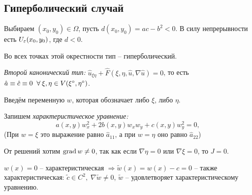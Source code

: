 \documentclass[../main.tex]{subfiles}
\begin{document}
\subsection{Гиперболический случай}

Выбираем $(x_0, y_0) \in \Omega$, пусть $d(x_0, y_0) = ac - b^2 < 0$. В силу непрерывности есть $U_\varepsilon(x_0, y_0)$, где $d < 0$.

Во всех точках этой окрестности тип -- гиперболический.

\begin{definition}
\textit{Второй канонический тип:} $\hat{u}_{\xi\eta} + \hat{F}(\xi, \eta, \hat{u}, \nabla \hat{u}) = 0$, то есть $\hat{a} \equiv \hat{c} \equiv 0 \;\;\forall\: \xi, \eta \in V(\xi^{\circ}, \eta^{\circ})$.
\end{definition}
Введём переменную $w$, которая обозначает либо $\xi$, либо $\eta$.

Запишем \textit{характеристическое уравнение:}
\begin{equation*}
	a(x, y) w^{2}_x + 2b(x, y)w_x w_y + c(x, y)w_y^2  = 0, 
\end{equation*}
(При $w = \xi$ это выражение равно $\hat a_{11}$, а при $w = \eta$ оно равно $\hat a_{22}$)

От решений хотим $\operatorname{grad} w \neq 0$, так как если $\nabla \eta = 0$ или $\nabla \xi = 0$, то $J = 0$.

\begin{remark}
	$w(x) = 0$ -- характеристическая $\Rightarrow \tilde{w}(x) =  w(x) - c = 0$ -- также характеристическая: $\tilde{c} \in C^2,\; \nabla \tilde{w} \neq 0$, $\tilde{w}$ -- удовлетворяет характеристическому уравнению.
\end{remark}
\end{document}
